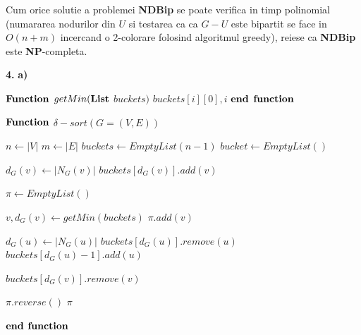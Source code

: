 \documentclass{article}
\begin{document}
Cum orice solutie a problemei {\bf NDBip} se poate verifica in timp polinomial (numararea nodurilor din $U$ si testarea ca ca $G-U$ este bipartit se face in $O(n+m)$ incercand o 2-colorare folosind algoritmul greedy), reiese ca {\bf NDBip} este {\bf NP}-completa.


{\bf 4.} {\bf a)}

\begin{algorithmic}
\STATE ${\bf Function}$ $getMin({\bf List}$ $buckets)$
        \RETURN $buckets[i][0], i$ 
    \ENDIF
\ENDFOR
\STATE ${\bf end}$ ${\bf function}$

\STATE ${\bf Function}$ $\delta - sort (G=(V,E))$

\STATE $n \gets |V|$
\STATE $m \gets |E|$
\STATE $buckets \gets EmptyList(n-1)$ 
    \STATE $bucket \gets EmptyList()$
\ENDFOR

    \STATE $d_G(v) \gets |N_G(v)|$ 
    \STATE $buckets[d_G(v)].add(v)$
\ENDFOR

\STATE $\pi \gets EmptyList()$

    \STATE $v, d_G(v) \gets getMin(buckets)$
    \STATE $\pi .add(v)$
    
        \STATE {}
        \STATE $d_G(u) \gets |N_G(u)|$
        \STATE $buckets[d_G(u)].remove(u)$
        \STATE $buckets[d_G(u)-1].add(u)$
    \ENDFOR
    
    \STATE $buckets[d_G(v)].remove(v)$
\ENDFOR

\STATE $\pi .reverse()$
\RETURN $\pi$

\STATE ${\bf end}$ ${\bf function}$
\end{algorithmic}
\end{document}
